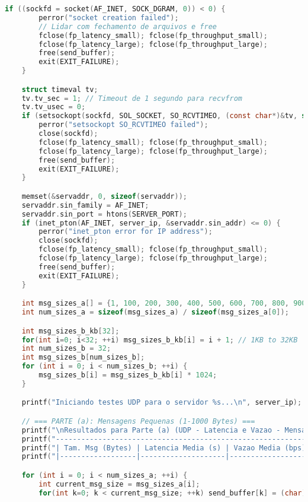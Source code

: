 \begin{lstlisting}[language=C, caption={Código fonte do Testador UDP (tester\_udp.c)}, label={lst:tester_udp}]
    if ((sockfd = socket(AF_INET, SOCK_DGRAM, 0)) < 0) {
        perror("socket creation failed");
        // Lidar com fechamento de arquivos e free
        fclose(fp_latency_small); fclose(fp_throughput_small);
        fclose(fp_latency_large); fclose(fp_throughput_large);
        free(send_buffer);
        exit(EXIT_FAILURE);
    }

    struct timeval tv;
    tv.tv_sec = 1; // Timeout de 1 segundo para recvfrom
    tv.tv_usec = 0;
    if (setsockopt(sockfd, SOL_SOCKET, SO_RCVTIMEO, (const char*)&tv, sizeof tv) < 0) {
        perror("setsockopt SO_RCVTIMEO failed");
        close(sockfd);
        fclose(fp_latency_small); fclose(fp_throughput_small);
        fclose(fp_latency_large); fclose(fp_throughput_large);
        free(send_buffer);
        exit(EXIT_FAILURE);
    }

    memset(&servaddr, 0, sizeof(servaddr));
    servaddr.sin_family = AF_INET;
    servaddr.sin_port = htons(SERVER_PORT);
    if (inet_pton(AF_INET, server_ip, &servaddr.sin_addr) <= 0) {
        perror("inet_pton error for IP address");
        close(sockfd);
        fclose(fp_latency_small); fclose(fp_throughput_small);
        fclose(fp_latency_large); fclose(fp_throughput_large);
        free(send_buffer);
        exit(EXIT_FAILURE);
    }

    int msg_sizes_a[] = {1, 100, 200, 300, 400, 500, 600, 700, 800, 900, 1000};
    int num_sizes_a = sizeof(msg_sizes_a) / sizeof(msg_sizes_a[0]);

    int msg_sizes_b_kb[32];
    for(int i=0; i<32; ++i) msg_sizes_b_kb[i] = i + 1; // 1KB to 32KB
    int num_sizes_b = 32;
    int msg_sizes_b[num_sizes_b];
    for (int i = 0; i < num_sizes_b; ++i) {
        msg_sizes_b[i] = msg_sizes_b_kb[i] * 1024;
    }

    printf("Iniciando testes UDP para o servidor %s...\n", server_ip);

    // === PARTE (a): Mensagens Pequenas (1-1000 Bytes) ===
    printf("\nResultados para Parte (a) (UDP - Latencia e Vazao - Mensagens Pequenas):\n");
    printf("-------------------------------------------------------------\n");
    printf("| Tam. Msg (Bytes) | Latencia Media (s) | Vazao Media (bps) |\n");
    printf("|------------------|--------------------|-------------------|\n");

    for (int i = 0; i < num_sizes_a; ++i) {
        int current_msg_size = msg_sizes_a[i];
        for(int k=0; k < current_msg_size; ++k) send_buffer[k] = (char)('A' + (k % 26));


\end{lstlisting}
